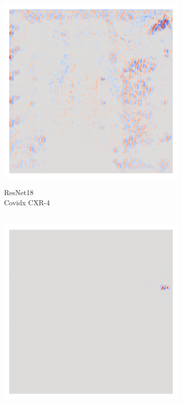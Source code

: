 \begin{figure}[H]
    \centering
    \captionsetup{justification=centering}
    \begin{subfigure}{0.19\linewidth}
        \centering
        \\
        \includegraphics[width=\linewidth]{01-images/05-resultate/uap_resnet18/uap0-resnet18-covidx_data-n200-robustificationslevel0.png}
        \caption{ResNet18 \\Covidx CXR-4}
    \end{subfigure}
    \hfill%
    \begin{subfigure}{0.19\linewidth}
        \centering
        \\
        \includegraphics[width=\linewidth]{01-images/05-resultate/uap_resnet18/uap0-resnet18-covidx_data-n200-robustificationslevel9.png}

\end{subfigure}
\end{figure}
